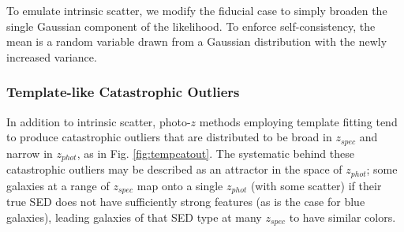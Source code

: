 \documentclass[iop]{emulateapj}
\begin{document}
To emulate intrinsic scatter, we modify the fiducial case to simply broaden the 
single Gaussian component of the likelihood.  To enforce self-consistency, the 
mean is a random variable drawn from a Gaussian distribution with the newly 
increased variance.

\subsubsection{Template-like Catastrophic Outliers}
\label{sec:tempcatout}

In addition to intrinsic scatter, photo-$z$ methods employing template fitting 
tend to produce catastrophic outliers that are distributed to be broad in 
$z_{spec}$ and narrow in $z_{phot}$, as in Fig. \ref{fig:tempcatout}.  The 
systematic behind these catastrophic outliers may be described as an attractor 
in the space of $z_{phot}$; some galaxies at a range of $z_{spec}$ map onto a 
single $z_{phot}$ (with some scatter) if their true SED does not have 
sufficiently strong features (as is the case for blue galaxies), leading 
galaxies of that SED type at many $z_{spec}$ to have similar colors.
\end{document}
